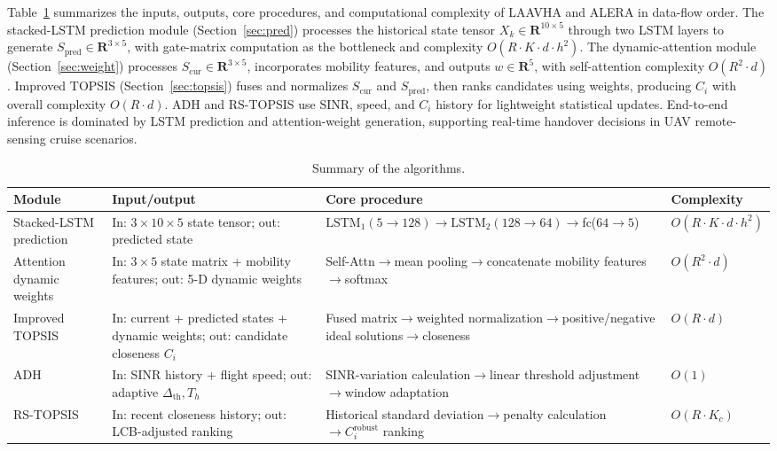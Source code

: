 \documentclass[remotesensing,article,submit,moreauthors]{Definitions/mdpi}
\newcommand{\arw}{$\rightarrow$\allowbreak\hspace{0pt}}
\begin{document}
Table~\ref{tab:complexity} summarizes the inputs, outputs, core procedures, and computational complexity of LAAVHA and ALERA in data-flow order. The stacked-LSTM prediction module (Section~\ref{sec:pred}) processes the historical state tensor $X_k\in\mathbf{R}^{10\times5}$ through two LSTM layers to generate $S_{\mathrm{pred}}\in\mathbf{R}^{3\times5}$, with gate-matrix computation as the bottleneck and complexity $O(R\cdot K\cdot d\cdot h^2)$. The dynamic-attention module (Section~\ref{sec:weight}) processes $S_{\mathrm{cur}}\in\mathbf{R}^{3\times5}$, incorporates mobility features, and outputs $w\in\mathbf{R}^5$, with self-attention complexity $O(R^2\cdot d)$. Improved TOPSIS (Section~\ref{sec:topsis}) fuses and normalizes $S_{\mathrm{cur}}$ and $S_{\mathrm{pred}}$, then ranks candidates using weights, producing $C_i$ with overall complexity $O(R\cdot d)$. ADH and RS-TOPSIS use SINR, speed, and $C_i$ history for lightweight statistical updates. End-to-end inference is dominated by LSTM prediction and attention-weight generation, supporting real-time handover decisions in UAV remote-sensing cruise scenarios.

\begin{table}[H]
\centering
\caption{Summary of the algorithms.}
\small
\begin{tabularx}{\textwidth}{>{\raggedright\arraybackslash}p{2.6cm}>{\raggedright\arraybackslash}X>{\raggedright\arraybackslash}X>{\raggedright\arraybackslash}p{2.3cm}}
\toprule
\textbf{Module} & \textbf{Input/output} & \textbf{Core procedure} & \textbf{Complexity} \\
\midrule
Stacked-LSTM prediction & In: $3\times10\times5$ state tensor; out: predicted state & $\mathrm{LSTM}_1(5\rightarrow128)\rightarrow\mathrm{LSTM}_2(128\rightarrow64)\rightarrow$fc($64\rightarrow5$) & $O(R\cdot K\cdot d\cdot h^2)$ \\
Attention dynamic weights & In: $3\times5$ state matrix + mobility features; out: 5-D dynamic weights & Self-Attn\arw{}mean pooling\arw{}concatenate mobility features\arw{}softmax & $O(R^2\cdot d)$ \\
Improved TOPSIS & In: current + predicted states + dynamic weights; out: candidate closeness $C_i$ & Fused matrix\arw{}weighted normalization\arw{}positive/negative ideal solutions\arw{}closeness & $O(R\cdot d)$ \\
ADH & In: SINR history + flight speed; out: adaptive $\Delta_{\mathrm{th}},T_h$ & SINR-variation calculation\arw{}linear threshold adjustment\arw{}window adaptation & $O(1)$ \\
RS-TOPSIS & In: recent closeness history; out: LCB-adjusted ranking & Historical standard deviation\arw{}penalty calculation$\rightarrow C_i^{\mathrm{robust}}$ ranking & $O(R\cdot K_c)$ \\
\bottomrule
\end{tabularx}
\label{tab:complexity}
\end{table}
\end{document}
